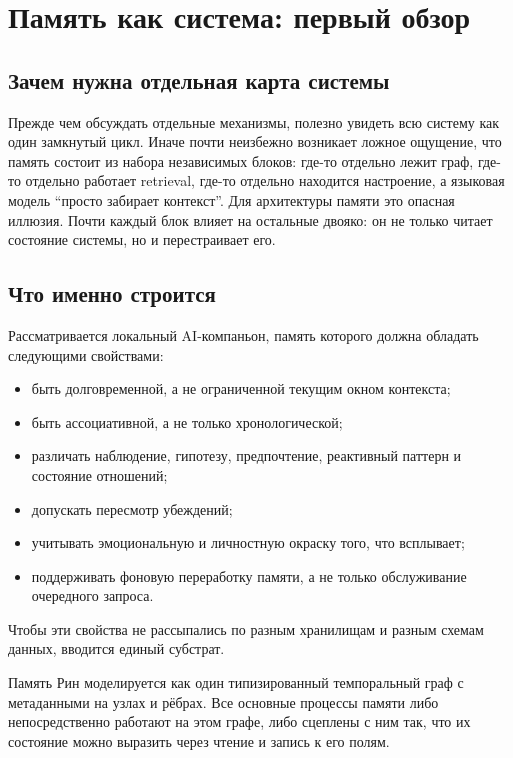 \chapter{Память как система: первый обзор}
\label{ch:architecture}

\section{Зачем нужна отдельная карта системы}

Прежде чем обсуждать отдельные механизмы, полезно увидеть всю систему как один
замкнутый цикл. Иначе почти неизбежно возникает ложное ощущение, что память
состоит из набора независимых блоков: где-то отдельно лежит граф, где-то
отдельно работает retrieval, где-то отдельно находится настроение, а языковая
модель ``просто забирает контекст''. Для архитектуры памяти это опасная
иллюзия. Почти каждый блок влияет на остальные двояко: он не только читает
состояние системы, но и перестраивает его.

\section{Что именно строится}

Рассматривается локальный AI-компаньон, память которого должна обладать
следующими свойствами:

\begin{itemize}
\item быть долговременной, а не ограниченной текущим окном контекста;
\item быть ассоциативной, а не только хронологической;
\item различать наблюдение, гипотезу, предпочтение, реактивный паттерн и состояние отношений;
\item допускать пересмотр убеждений;
\item учитывать эмоциональную и личностную окраску того, что всплывает;
\item поддерживать фоновую переработку памяти, а не только обслуживание очередного запроса.
\end{itemize}

Чтобы эти свойства не рассыпались по разным хранилищам и разным схемам
данных, вводится единый субстрат.

\begin{principle}
Память Рин моделируется как один типизированный темпоральный граф с
метаданными на узлах и рёбрах. Все основные процессы памяти либо
непосредственно работают на этом графе, либо сцеплены с ним так, что их
состояние можно выразить через чтение и запись к его полям.
\end{principle}

